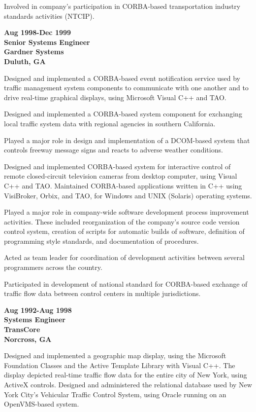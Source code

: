 Involved in company's participation in CORBA-based transportation
industry standards activities (NTCIP).

\textbf{Aug 1998-Dec 1999\\
Senior Systems Engineer\\
Gardner Systems\\
Duluth, GA}

Designed and implemented a CORBA-based event notification service used
by traffic management system components to communicate with one another
and to drive real-time graphical displays, using Microsoft Visual C++
and TAO.

Designed and implemented a CORBA-based system component for exchanging
local traffic system data with regional agencies in southern California.

Played a major role in design and implementation of a DCOM-based system
that controls freeway message signs and reacts to adverse weather
conditions.

Designed and implemented CORBA-based system for interactive control of
remote closed-circuit television cameras from desktop computer, using
Visual C++ and TAO. Maintained CORBA-based applications written in C++
using VisiBroker, Orbix, and TAO, for Windows and UNIX (Solaris)
operating systems.

Played a major role in company-wide software development process
improvement activities. These included reorganization of the company's
source code version control system, creation of scripts for automatic
builds of software, definition of programming style standards, and
documentation of procedures.

Acted as team leader for coordination of development activities between
several programmers across the country.

Participated in development of national standard for CORBA-based
exchange of traffic flow data between control centers in multiple
jurisdictions.

\textbf{Aug 1992-Aug 1998\\
Systems Engineer\\
TransCore\\
Norcross, GA}

Designed and implemented a geographic map display, using the Microsoft
Foundation Classes and the Active Template Library with Visual C++. The
display depicted real-time traffic flow data for the entire city of New
York, using ActiveX controls. Designed and administered the relational
database used by New York City's Vehicular Traffic Control System, using
Oracle running on an OpenVMS-based system.

